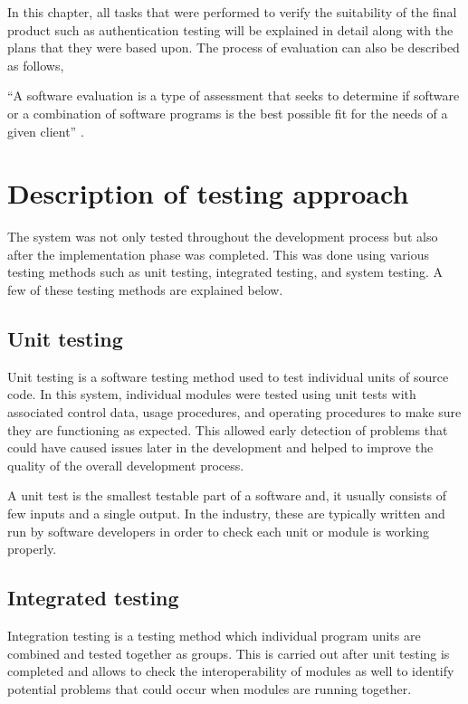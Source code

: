 \documentclass[12pt]{report}
\begin{document}
In this chapter, all tasks that were performed to verify the suitability of the final product such as authentication testing will be explained in detail along with the plans that they were based upon. The process of evaluation can also be described as follows,

``A software evaluation is a type of assessment that seeks to determine if software or a combination of software programs is the best possible fit for the needs of a given client'' \cite{tatum_2020_software_evaluation}.


\section{Description of testing approach}
The system was not only tested throughout the development process but also after the implementation phase was completed. This was done using various testing methods such as unit testing, integrated testing, and system testing.
A few of these testing methods are explained below.

\subsection{Unit testing}
Unit testing is a software testing method used to test individual units of source code. In this system, individual modules were tested using unit tests with associated control data, usage procedures, and operating procedures to make sure they are functioning as expected. This allowed early detection of problems that could have caused issues later in the development and helped to improve the quality of the overall development process.

A unit test is the smallest testable part of a software and, it usually consists of few inputs and a single output. In the industry, these are typically written and run by software developers in order to check each unit or module is working properly.

\subsection{Integrated testing}
Integration testing is a testing method which individual program units are combined and tested together as groups. This is carried out after unit testing is completed and allows to check the interoperability of modules as well to identify potential problems that could occur when modules are running together.
\end{document}
